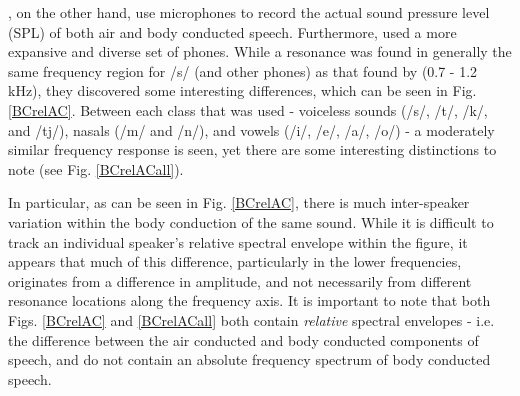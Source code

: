 \documentclass[dissertation,copyright]{uathesis}
\begin{document}
\cite{reinfeldt:10}, on the other hand, use microphones to record the actual sound pressure level (SPL) of both air and body conducted speech. Furthermore, \cite{reinfeldt:10} used a more expansive and diverse set of phones.  While a resonance was found in generally the same frequency region for /s/ (and other phones) as that found by \cite{porschmann:00} (0.7 - 1.2 kHz), they discovered some interesting differences, which can be seen in Fig. \ref{BCrelAC}. Between each class that was used - voiceless sounds (/s/, /t/, /k/, and /tj/),  nasals (/m/ and /n/), and vowels (/i/, /e/, /a/, /o/) - a moderately similar frequency response is seen, yet there are some interesting distinctions to note (see Fig. \ref{BCrelACall}).

In particular, as can be seen in Fig. \ref{BCrelAC}, there is much inter-speaker variation within the body conduction of the same sound.  While it is difficult to track an individual speaker's relative spectral envelope within the figure, it appears that much of this difference, particularly in the lower frequencies, originates from a difference in amplitude, and not necessarily from different resonance locations along the frequency axis.  It is important to note that both Figs. \ref{BCrelAC} and \ref{BCrelACall} both contain \textit{relative} spectral envelopes - i.e. the difference between the air conducted and body conducted components of speech, and do not contain an absolute frequency spectrum of body conducted speech. 
\end{document}
